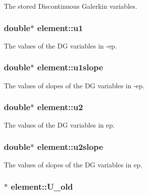 The stored Discontinuous Galerkin variables. 

\subsubsection[{u1}]{\setlength{\rightskip}{0pt plus 5cm}double$\ast$ element\-::u1}\label{classelement_a35bc049ae767ff3bb3ace6983d8a22a7}


The values of the D\-G variables in -\/ep. 

\subsubsection[{u1slope}]{\setlength{\rightskip}{0pt plus 5cm}double$\ast$ element\-::u1slope}\label{classelement_ae9779e7ddf4675c3a7ef3a5955aa613c}


The values of slopes of the D\-G variables in -\/ep. 

\subsubsection[{u2}]{\setlength{\rightskip}{0pt plus 5cm}double$\ast$ element\-::u2}\label{classelement_ad58036341aac37c97cb81d28f5e26409}


The values of the D\-G variables in ep. 

\subsubsection[{u2slope}]{\setlength{\rightskip}{0pt plus 5cm}double$\ast$ element\-::u2slope}\label{classelement_a7488ad853e91d10a94afbdd7b0450682}


The values of slopes of the D\-G variables in ep. 

\subsubsection[{U\-\_\-old}]{$\ast$ element\-::\-U\-\_\-old}\label{classelement_a7c6730d8fb495e959b0479f2c6a21d9d}


